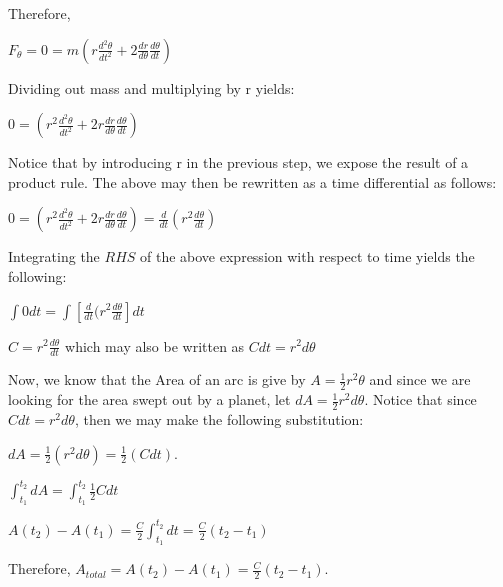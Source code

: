 \documentclass{report}
\begin{document}
\begin{enumerate}
Therefore, \begin{center}
$F_\theta=0=m(r\frac{d^2\theta}{dt^2}+2\frac{dr}{d\theta}\frac{d\theta}{dt})$

\end{center}
Dividing out mass and multiplying by r yields:

\begin{center} $0=(r^2\frac{d^2\theta}{dt^2}+2r\frac{dr}{d\theta}\frac{d\theta}{dt})$ \end{center}

Notice that by introducing r in the previous step, we expose the result of a product rule. The above may then be rewritten as a time differential as follows: 

\begin{center}$0=(r^2\frac{d^2\theta}{dt^2}+2r\frac{dr}{d\theta}\frac{d\theta}{dt})=\frac{d}{dt}(r^2\frac{d\theta}{dt})$\end{center} 

Integrating the $RHS$ of the above expression with respect to time yields the following:

\begin{center}$\int0 dt=\int[\frac{d}{dt}(r^2\frac{d\theta}{dt}]dt$\end{center}

\begin{center}$C=r^2\frac{d\theta}{dt}$ which may also be written as  $Cdt=r^2d\theta$\end{center}

Now, we know that the Area of an arc is give by $A = \frac{1}{2}r^2\theta$ and since we are looking for the area swept out by a planet, let $dA=\frac{1}{2}r^2d\theta$. Notice that since $Cdt=r^2d\theta$, then we may make the following substitution:

\begin{center}$dA=\frac{1}{2}(r^2d\theta) = \frac{1}{2}(Cdt)$.\end{center}

\begin{center}$\displaystyle \int^{t_2}_{t_1}dA =\int^{t_2}_{t_1} \frac{1}{2}Cdt$\end{center}

\begin{center}$\displaystyle A(t_2)-A(t_1)= \frac{C}{2}\int^{t_2}_{t_1}dt=\frac{C}{2}(t_2-t_1)$ \end{center}

\begin{center}Therefore, $A_{total}=A(t_2)-A(t_1)=\frac{C}{2}(t_2-t_1). \;$ 
\end{center}


\end{enumerate}
\end{document}
